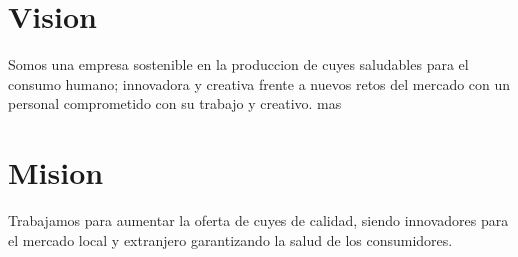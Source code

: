 \documentclass[11pt]{article}
\begin{document}
\section{Vision}
Somos una empresa sostenible en la produccion de cuyes saludables para el consumo humano; innovadora y creativa frente a nuevos retos del mercado con un personal comprometido con su trabajo y creativo.
    mas
\section{Mision}
Trabajamos para aumentar la oferta de cuyes de calidad, siendo innovadores para el mercado local y extranjero garantizando la salud de los consumidores.
\end{document}
